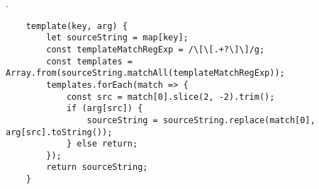 .\\
\begin{lstlisting}
    template(key, arg) {
        let sourceString = map[key];
        const templateMatchRegExp = /\[\[.+?\]\]/g;
        const templates = Array.from(sourceString.matchAll(templateMatchRegExp));
        templates.forEach(match => {
            const src = match[0].slice(2, -2).trim();
            if (arg[src]) {
                sourceString = sourceString.replace(match[0], arg[src].toString());
            } else return;
        });
        return sourceString;
    } 
\end{lstlisting}

